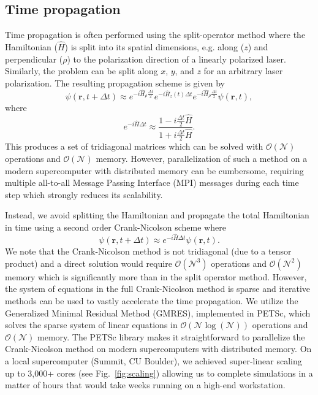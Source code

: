 \subsection{Time propagation} %
\label{sub:time_propagation}
Time propagation is often performed using the split-operator method where the Hamiltonian ($\hat{H}$) is split into its spatial dimensions, e.g. along ($z$) and perpendicular ($\rho$) to the polarization direction of a linearly polarized laser. Similarly, the problem can be split along $x$, $y$, and $z$ for an arbitrary laser polarization. The resulting propagation scheme is given by
%
\begin{equation}
    \psi(\mathbf{r},t+\Delta t) \approx e^{-i\hat{H}_{\rho}\frac{\Delta t}{2}} e^{-i\hat{H}_z(t)\Delta t} e^{-i\hat{H}_{\rho}\frac{\Delta t}{2}}\psi(\mathbf{r},t),
     \label{eq:Split-operator}
\end{equation}
%
where
\begin{equation}
    e^{-i\hat{H}\Delta t} \approx \frac{1-i\frac{\Delta t}{2} \hat{H}}{1+i\frac{\Delta t}{2} \hat{H}}.
\end{equation}
This produces a set of tridiagonal matrices which can be solved with $\mathcal{O}(\mathcal{N})$ operations and $\mathcal{O}(\mathcal{N})$ memory. However, parallelization of such a method on a modern supercomputer with distributed memory can be cumbersome, requiring multiple all-to-all Message Passing Interface (MPI) messages during each time step which strongly reduces its scalability.

Instead, we avoid splitting the Hamiltonian and propagate the total Hamiltonian in time using a second order Crank-Nicolson scheme where
%
\begin{equation}
    \psi(\mathbf{r},t+\Delta t) \approx e^{-i\hat{H}\Delta t}\psi(\mathbf{r},t).
    \label{eq:Crank_Nicolson}
\end{equation}
%
We note that the Crank-Nicolson method is not tridiagonal (due to a tensor product) and a direct solution would require $\mathcal{O}(\mathcal{N}^3)$ operations and $\mathcal{O}(\mathcal{N}^2)$ memory which is significantly more than in the split operator method. However, the system of equations in the full Crank-Nicolson method is sparse and iterative methods can be used to vastly accelerate the time propagation. We utilize the Generalized Minimal Residual Method (GMRES), implemented in PETSc, which solves the sparse system of linear equations in $\mathcal{O}(\mathcal{N}\log(\mathcal{N}))$ operations and $\mathcal{O}(\mathcal{N})$ memory. The PETSc library makes it straightforward to parallelize the Crank-Nicolson method on modern supercomputers with distributed memory. On a local supercomputer (Summit, CU Boulder), we achieved super-linear scaling up to 3,000+ cores (see Fig.~\ref{fig:scaling}) allowing us to complete simulations in a matter of hours that would take weeks running on a high-end workstation. 



